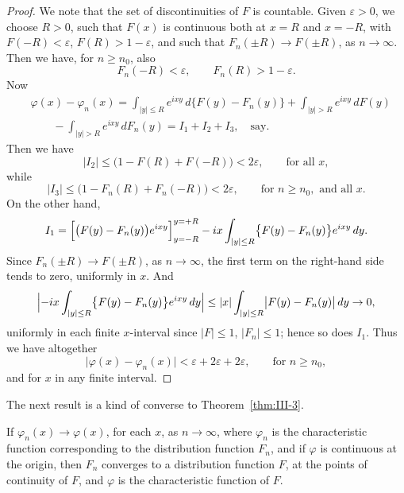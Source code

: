 \begin{proof}
We note that the set of discontinuities of $F$ is countable. Given $\varepsilon>0$, we choose $R>0$, such that $F(x)$ is continuous both at $x=R$ and $x=-R$, with $F(-R)<\varepsilon$, $F(R)>1-\varepsilon$, and such that $F_{n}(\pm R)\to F(\pm R)$, as $n\to\infty$. Then we have, for $n\ge n_{0}$, also
\[
F_{n}(-R)<\varepsilon,\qquad F_{n}(R)>1-\varepsilon.
\]
Now
\begin{align*}
&\varphi(x)-\varphi_{n}(x)
=\int_{|y|\le R}e^{ixy}\,d\bigl\{F(y)-F_{n}(y)\bigr\}+\int_{|y|>R}e^{ixy}\,dF(y)\\
&\qquad-\int_{|y|>R}e^{ixy}\,dF_{n}(y)=I_{1}+I_{2}+I_{3},\quad\text{say.}
\end{align*}
Then we have
\[
|I_{2}|\le\bigl(1-F(R)+F(-R)\bigr)<2\varepsilon,\qquad\text{for all }x,
\]
while
\[
|I_{3}|\le\bigl(1-F_{n}(R)+F_{n}(-R)\bigr)<2\varepsilon,\qquad\text{for }n\ge n_{0},\text{ and all }x.
\]
On the other hand,
\[
I_{1}=\Bigl[\bigl(F(y)-F_{n}(y)\bigr)e^{ixy}\Bigr]_{y=-R}^{y=+R}-ix\int_{|y|\le R}\bigl\{F(y)-F_{n}(y)\bigr\}e^{ixy}\,dy.
\]
Since $F_{n}(\pm R)\to F(\pm R)$, as $n\to\infty$, the first term on the right-hand side tends to zero, uniformly in $x$. And
\[
\Bigl|-ix\int_{|y|\le R}\bigl\{F(y)-F_{n}(y)\bigr\}e^{ixy}\,dy\Bigr|
\le|x|\int_{|y|\le R}\bigl|F(y)-F_{n}(y)\bigr|\,dy\to0,
\]
uniformly in each finite $x$-interval since $|F|\le1$, $|F_{n}|\le1$; hence so does $I_{1}$. Thus we have altogether
\[
\bigl|\varphi(x)-\varphi_{n}(x)\bigr|<\varepsilon+2\varepsilon+2\varepsilon,\qquad\text{for }n\ge n_{0},
\]
and for $x$ in any finite interval.
\end{proof}

The next result is a kind of converse to Theorem~\ref{thm:III-3}.

\begin{theorem}\label{thm:III-4}
If $\varphi_{n}(x)\to\varphi(x)$, for each $x$, as $n\to\infty$, where $\varphi_{n}$ is the characteristic function corresponding to the distribution function $F_{n}$, and if $\varphi$ is continuous at the origin, then $F_{n}$ converges to a distribution function $F$, at the points of continuity of $F$, and $\varphi$ is the characteristic function of $F$.
\end{theorem}

